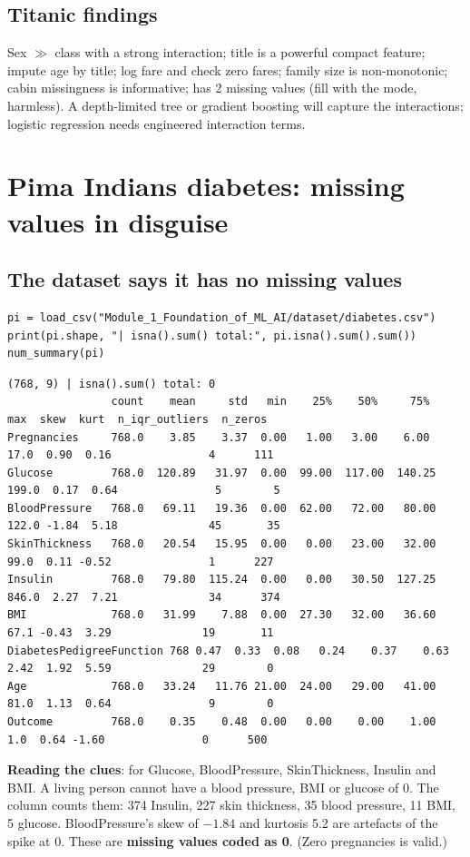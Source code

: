 \subsection{Titanic findings}
Sex $\gg$ class with a strong interaction; title is a powerful compact feature; impute age by title; log fare and check zero fares; family size is non-monotonic; cabin missingness is
informative;  has 2 missing values (fill with the mode, harmless). A depth-limited tree or gradient boosting will capture the interactions; logistic regression needs
engineered interaction terms.

\section{Pima Indians diabetes: missing values in disguise}
\subsection{The dataset says it has no missing values}
\begin{lstlisting}
pi = load_csv("Module_1_Foundation_of_ML_AI/dataset/diabetes.csv")
print(pi.shape, "| isna().sum() total:", pi.isna().sum().sum())
num_summary(pi)
\end{lstlisting}
\outlabel
\begin{lstlisting}[style=out]
(768, 9) | isna().sum() total: 0
                count    mean     std   min    25%    50%     75%    max  skew  kurt  n_iqr_outliers  n_zeros
Pregnancies     768.0    3.85    3.37  0.00   1.00   3.00    6.00   17.0  0.90  0.16               4      111
Glucose         768.0  120.89   31.97  0.00  99.00  117.00  140.25  199.0  0.17  0.64               5        5
BloodPressure   768.0   69.11   19.36  0.00  62.00   72.00   80.00  122.0 -1.84  5.18              45       35
SkinThickness   768.0   20.54   15.95  0.00   0.00   23.00   32.00   99.0  0.11 -0.52               1      227
Insulin         768.0   79.80  115.24  0.00   0.00   30.50  127.25  846.0  2.27  7.21              34      374
BMI             768.0   31.99    7.88  0.00  27.30   32.00   36.60   67.1 -0.43  3.29              19       11
DiabetesPedigreeFunction 768 0.47  0.33  0.08   0.24    0.37    0.63    2.42  1.92  5.59              29        0
Age             768.0   33.24   11.76 21.00  24.00   29.00   41.00   81.0  1.13  0.64               9        0
Outcome         768.0    0.35    0.48  0.00   0.00    0.00    1.00    1.0  0.64 -1.60               0      500
\end{lstlisting}
\textbf{Reading the clues}:  for Glucose, BloodPressure, SkinThickness, Insulin and BMI. A living person cannot have a blood pressure, BMI or glucose of 0. The
 column counts them: 374 Insulin, 227 skin thickness, 35 blood pressure, 11 BMI, 5 glucose. BloodPressure's skew of $-1.84$ and kurtosis 5.2 are artefacts of the
spike at 0. These are \textbf{missing values coded as 0}. (Zero pregnancies is valid.)

